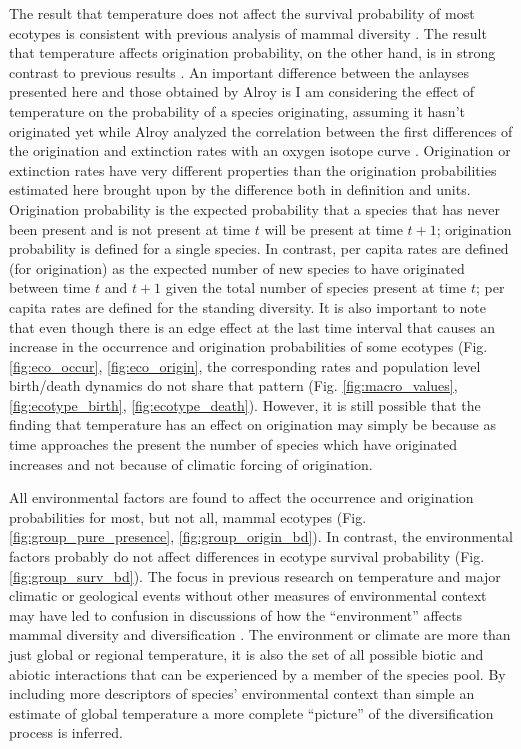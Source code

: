 The result that temperature does not affect the survival probability of most ecotypes is consistent with previous analysis of mammal diversity \citep{Alroy2000g}. The result that temperature affects origination probability, on the other hand, is in strong contrast to previous results \citep{Alroy2000g}. An important difference between the anlayses presented here and those obtained by Alroy \citep{Alroy2000g} is I am considering the effect of temperature on the probability of a species originating, assuming it hasn't originated yet while Alroy \citep{Alroy2000g} analyzed the correlation between the first differences of the origination and extinction rates with an oxygen isotope curve \citep{Zachos2001}. Origination or extinction rates have very different properties than the origination probabilities estimated here brought upon by the difference both in definition and units. Origination probability is the expected probability that a species that has never been present and is not present at time \(t\) will be present at time \(t + 1\); origination probability is defined for a single species. In contrast, per capita rates are defined (for origination) as the expected number of new species to have originated between time \(t\) and \(t + 1\) given the total number of species present at time \(t\); per capita rates are defined for the standing diversity. It is also important to note that even though there is an edge effect at the last time interval that causes an increase in the occurrence and origination probabilities of some ecotypes (Fig. \ref{fig:eco_occur}, \ref{fig:eco_origin}, the corresponding rates and population level birth/death dynamics do not share that pattern (Fig. \ref{fig:macro_values}, \ref{fig:ecotype_birth}, \ref{fig:ecotype_death}). However, it is still possible that the finding that temperature has an effect on origination may simply be because as time approaches the present the number of species which have originated increases and not because of climatic forcing of origination. 

All environmental factors are found to affect the occurrence and origination probabilities for most, but not all, mammal ecotypes (Fig. \ref{fig:group_pure_presence}, \ref{fig:group_origin_bd}). In contrast, the environmental factors probably do not affect differences in ecotype survival probability (Fig. \ref{fig:group_surv_bd}). The focus in previous research on temperature and major climatic or geological events without other measures of environmental context may have led to confusion in discussions of how the ``environment'' affects mammal diversity and diversification \citep{Alroy2000g,Figueirido2012}. The environment or climate are more than just global or regional temperature, it is also the set of all possible biotic and abiotic interactions that can be experienced by a member of the species pool. By including more descriptors of species' environmental context than simple an estimate of global temperature a more complete ``picture'' of the diversification process is inferred.

